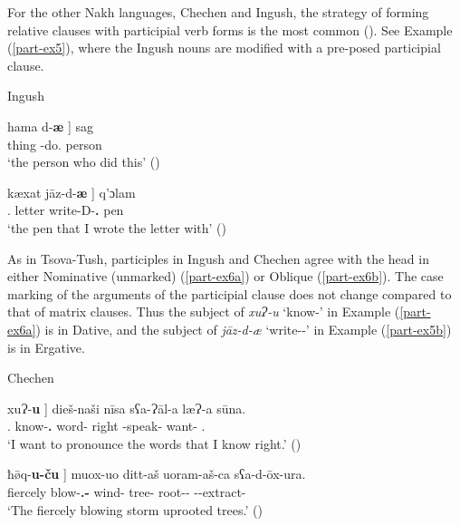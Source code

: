 For the other Nakh languages, Chechen and Ingush, the strategy of forming relative clauses with participial verb forms is the most common (\cites[171--173]{desherieva}[587--600]{nichols11}{komen}). See Example (\ref{part-ex5}), where the Ingush nouns are modified with a pre-posed participial clause.

\begin{exe}
	\ex\label{part-ex5} 
    	Ingush
    \begin{xlist}
	
			\ex\label{part-ex5a}
			\gll {{\normalfont[} je}	hama	{d-\textbf{æ} {\normalfont]}}	sag  \\
			{\Prox}	thing	{\D}-do.\textbf{{\Ptcp}}	person	\\
			\trans `the person who did this’
			\hfill (\cite[590]{nichols11})
			
			\ex\label{part-ex5b}
			\gll {{\normalfont [} \=az}	kæxat	{j\=az-d-\textbf{æ} {\normalfont]}}	q'ɔlam \\
			{\Fsg}.{\Erg}	letter	write-D-\textbf{{\Tr}.{\Ptcp}}	pen	 \\
			\trans `the pen that I wrote the letter with’ 
			\hfill (\cite[591]{nichols11})
		
	\end{xlist}
\end{exe}

As in Tsova-Tush, participles in Ingush and Chechen agree with the head in either Nominative (unmarked) (\ref{part-ex6a}) or Oblique (\ref{part-ex6b}). The case marking of the arguments of the participial clause does not change compared to that of matrix clauses. Thus the subject of \textit{xuɁ-u} `know-{\Ptcp}' in Example (\ref{part-ex6a}) is in Dative, and the subject of \textit{j\={a}z-d-æ} `write-{\D}-{\Ptcp}' in Example (\ref{part-ex5b}) is in Ergative.

\begin{exe}
	\ex\label{part-ex6} 
    	Chechen
    \begin{xlist}
	
		
			\ex\label{part-ex6a}
			\gll {{\normalfont[} sajna}	{xuɁ-\textbf{u} {\normalfont]}}	dieš-naši	nīsa	sʕa-Ɂāl-a	læɁ-a	sūna. \\	
			{\Fsg}.{\Dat}	know-\textbf{{\Ptcp}.{\Prs}}	word-{\Pl}	right	{\Pv}-speak-{\Inf}	want-{\Prs}	{\Fsg}.{\Dat}	\\
			\trans `I want to pronounce the words that I know right.’ 
			\hfill (\cite{komen})
		
		
		
			\ex\label{part-ex6b}
			\gll {{\normalfont[} lyra}	{ħ\={ø}q-\textbf{u-ču} {\normalfont]}}   muox-uo	ditt-aš	uoram-aš-ca	sʕa-d-ōx-ura. \\	
			fiercely	blow-\textbf{{\Ptcp}.{\Prs}-{\Obl}}	wind-{\Erg}	tree-{\Pl}	root-{\Pl}-{\Ins}	{\Pv}-{\D}-extract-{\Imprf}	\\
			\trans `The fiercely blowing storm uprooted trees.’ 
			\hfill (\cite{komen})
		
	\end{xlist}
\end{exe}

